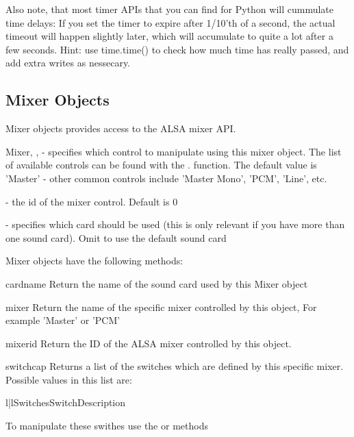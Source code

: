 Also note, that most timer APIs that you can find for Python will cummulate time delays: If you set the timer
to expire after 1/10'th of a second, the actual timeout will happen slightly later, which will accumulate to
quite a lot after a few seconds. Hint: use time.time() to check how much time has really passed, and add
extra writes as nessecary.

\subsection{Mixer Objects}
\label{mixer-objects}

Mixer objects provides access to the ALSA mixer API.

\begin{classdesc}{Mixer}{, , }
 - specifies which control to manipulate using this mixer object. The list
of available controls can be found with the . function.
The default value is 'Master' - other common controls include 'Master Mono', 'PCM', 'Line', etc.

 - the id of the mixer control. Default is 0

 - specifies which card should be used (this is only relevant 
if you have more than one sound card). Omit to use the default sound card
\end{classdesc}

Mixer objects have the following methods:

\begin{methoddesc}[Mixer]{cardname}{}
Return the name of the sound card used by this Mixer object
\end{methoddesc}

\begin{methoddesc}[Mixer]{mixer}{}
Return the name of the specific mixer controlled by this object, For example 'Master'
or 'PCM'
\end{methoddesc}

\begin{methoddesc}[Mixer]{mixerid}{}
Return the ID of the ALSA mixer controlled by this object.
\end{methoddesc}

\begin{methoddesc}[Mixer]{switchcap}{}
Returns a list of the switches which are defined by this specific mixer. Possible values in
this list are:

\begin{tableii}{l|l}{Switches}{Switch}{Description}
\end{tableii}

To manipulate these swithes use the  or  methods
\end{methoddesc}

